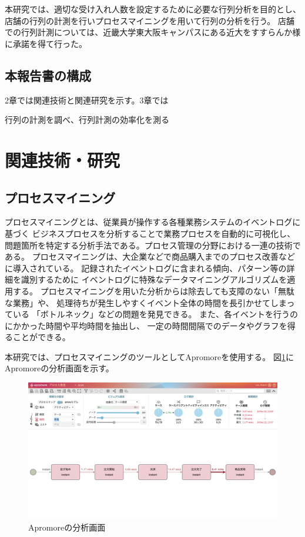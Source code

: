 \documentclass{jsarticle}
\begin{document}
本研究では、適切な受け入れ人数を設定するために必要な行列分析を目的とし、
店舗の行列の計測を行いプロセスマイニングを用いて行列の分析を行う。
店舗での行列計測については、近畿大学東大阪キャンパスにある近大をすすらんか様に承諾を得て行った。



\subsection{本報告書の構成}
2章では関連技術と関連研究を示す。3章では

行列の計測を調べ、行列計測の効率化を測る




\newpage


\section{関連技術・研究}
\subsection{プロセスマイニング}
プロセスマイニングとは、従業員が操作する各種業務システムのイベントログに基づく
ビジネスプロセスを分析することで業務プロセスを自動的に可視化し、
問題箇所を特定する分析手法である。プロセス管理の分野における一連の技術である。
プロセスマイニングは、大企業などで商品購入までのプロセス改善などに導入されている。
記録されたイベントログに含まれる傾向、パターン等の詳細を識別するために
イベントログに特殊なデータマイニングアルゴリズムを適用する。
プロセスマイニングを用いた分析からは除去しても支障のない「無駄な業務」や、
処理待ちが発生しやすくイベント全体の時間を長引かせてしまっている
「ボトルネック」などの問題を発見できる。
また、各イベントを行うのにかかった時間や平均時間を抽出し、
一定の時間間隔でのデータやグラフを得ることができる。

本研究では、プロセスマイニングのツールとしてApromoreを使用する。
図\ref{fig:3}にApromoreの分析画面を示す。

\begin{figure}[H]
  \centering
  \includegraphics[width=15cm]{3.png}
  \caption{Apromoreの分析画面}
  \label{fig:3}
\end{figure}
\end{document}

